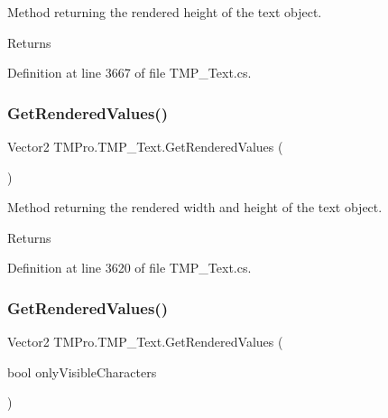 Method returning the rendered height of the text object. 

\begin{DoxyReturn}{Returns}

\end{DoxyReturn}


Definition at line 3667 of file T\+M\+P\+\_\+\+Text.\+cs.

\mbox{\label{class_t_m_pro_1_1_t_m_p___text_aac1235e0778a66ae1cf9c174196171c5}} 
\subsubsection{\texorpdfstring{GetRenderedValues()}{GetRenderedValues()}\hspace{0.1cm}{\footnotesize\ttfamily [1/2]}}
{\footnotesize\ttfamily Vector2 T\+M\+Pro.\+T\+M\+P\+\_\+\+Text.\+Get\+Rendered\+Values (\begin{DoxyParamCaption}{ }\end{DoxyParamCaption})}



Method returning the rendered width and height of the text object. 

\begin{DoxyReturn}{Returns}

\end{DoxyReturn}


Definition at line 3620 of file T\+M\+P\+\_\+\+Text.\+cs.

\mbox{\label{class_t_m_pro_1_1_t_m_p___text_a47a974ab674a361f2351ff8bf7e0da22}} 
\subsubsection{\texorpdfstring{GetRenderedValues()}{GetRenderedValues()}\hspace{0.1cm}{\footnotesize\ttfamily [2/2]}}
{\footnotesize\ttfamily Vector2 T\+M\+Pro.\+T\+M\+P\+\_\+\+Text.\+Get\+Rendered\+Values (\begin{DoxyParamCaption}\item[{bool}]{only\+Visible\+Characters }\end{DoxyParamCaption})}






